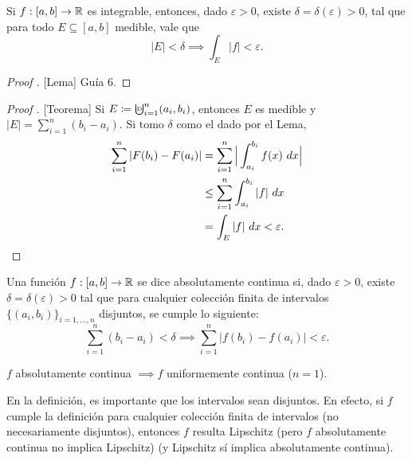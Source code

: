 \begin{lemma}
	Si $f : [a,b] \to \mathbb{R}$ es integrable, entonces, dado $\varepsilon > 0$, existe $\delta = \delta(\varepsilon) > 0$, tal que para todo $E \subseteq [a,b]$ medible, vale que
	\[ |E| < \delta \implies \int_{E} |f| < \varepsilon. \]
\end{lemma}
\begin{proof}[Proof ][Lema]
	Guía 6.
\end{proof}

\begin{proof}[Proof ][Teorema]
	Si $E \coloneq \textbigcupd_{i=1}^{n}(a_{i}, b_{i})$, entonces $E$ es medible y $|E| = \sum_{i=1}^{n}(b_{i} - a_{i})$. Si tomo $\delta$ como el dado por el Lema,
	\begin{align*}
		\sum_{i=1}^{n} |F(b_{i}) - F(a_{i})| &= \sum_{i=1}^{n} \Big| \int_{a_{i}}^{b_{i}} f(x) \ dx \Big| \\
		&\leq \sum_{i=1}^{n} \int_{a_{i}}^{b_{i}} |f| \ dx \\
		&= \int_{E} |f| \ dx < \varepsilon
	.\qedhere\end{align*}
\end{proof}

\begin{definition}
	Una función $f : [a,b] \to \mathbb{R}$ se dice absolutamente continua si, dado $\varepsilon > 0$, existe $\delta = \delta(\varepsilon) > 0$ tal que para cualquier colección finita de intervalos $\{(a_{i},b_{i})\}_{i=1,\dots,n}$ disjuntos, se cumple lo siguiente:
	\[ \sum_{i=1}^{n} (b_{i} - a_{i}) < \delta \implies \sum_{i=1}^{n} |f(b_{i}) - f(a_{i})| < \varepsilon. \]
\end{definition}

\begin{remark}
	$f$ absolutamente continua $\implies f$ uniformemente continua ($n=1$).
\end{remark}

\begin{remark}
	En la definición, es importante que los intervalos sean disjuntos. En efecto, si $f$ cumple la definición para cualquier colección finita de intervalos (no necesariamente disjuntos), entonces $f$ resulta Lipschitz (pero $f$ absolutamente continua no implica Lipschitz) (y Lipschitz sí implica absolutamente continua).
\end{remark}

